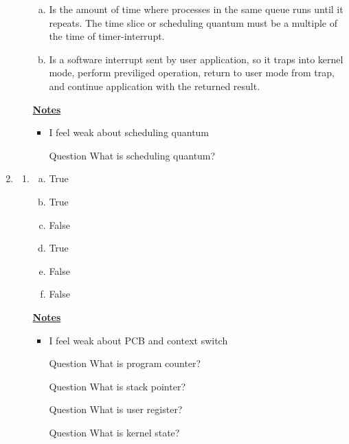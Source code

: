 \documentclass[12pt]{article}
\begin{document}
\begin{enumerate}[1.]
\begin{enumerate}[1)]
\begin{enumerate}[a)]
            \item Is the amount of time where processes in the same queue runs until
            it repeats. The time slice or scheduling quantum must be a multiple of
            the time of timer-interrupt.

            \item Is a software interrupt sent by user application, so it
            traps into kernel mode, perform previliged operation, return to user mode from trap,
            and continue application with the returned result.
        \end{enumerate}

        \bigskip

        \underline{\textbf{Notes}}

        \begin{itemize}
            \item I feel weak about scheduling quantum
            \item [\color{blue}Question\color{black}] What is scheduling quantum?
        \end{itemize}
    \end{enumerate}

    \item

    \begin{enumerate}[1)]
        \item

        \begin{enumerate}[a)]
            \item True
            \item True
            \item False
            \item True
            \item False
            \item False
        \end{enumerate}

        \bigskip

        \underline{\textbf{Notes}}

        \begin{itemize}
            \item I feel weak about PCB and context switch
            \item [\color{blue}Question\color{black}] What is program counter?
            \item [\color{blue}Question\color{black}] What is stack pointer?
            \item [\color{blue}Question\color{black}] What is user register?
            \item [\color{blue}Question\color{black}] What is kernel state?
        \end{itemize}


\end{enumerate}
\end{enumerate}
\end{document}
